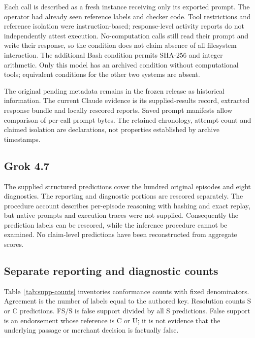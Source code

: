 Each call is described as a fresh instance receiving only its exported prompt. The operator had already seen reference labels and checker code. Tool restrictions and reference isolation were instruction-based; response-level activity reports do not independently attest execution. No-computation calls still read their prompt and write their response, so the condition does not claim absence of all filesystem interaction. The additional Bash condition permits SHA-256 and integer arithmetic. Only this model has an archived condition without computational tools; equivalent conditions for the other two systems are absent.

The original pending metadata remains in the frozen release as historical information. The current Claude evidence is its supplied-results record, extracted response bundle and locally rescored reports. Saved prompt manifests allow comparison of per-call prompt bytes. The retained chronology, attempt count and claimed isolation are declarations, not properties established by archive timestamps.

\subsection{Grok 4.7}
The supplied structured predictions cover the hundred original episodes and eight diagnostics. The reporting and diagnostic portions are rescored separately. The procedure account describes per-episode reasoning with hashing and exact replay, but native prompts and execution traces were not supplied. Consequently the prediction labels can be rescored, while the inference procedure cannot be examined. No claim-level predictions have been reconstructed from aggregate scores.

\subsection{Separate reporting and diagnostic counts}
Table~\ref{tab:supp-counts} inventories conformance counts with fixed denominators. Agreement is the number of labels equal to the authored key. Resolution counts S or C predictions. FS/S is false support divided by all S predictions. False support is an endorsement whose reference is C or U; it is not evidence that the underlying passage or merchant decision is factually false.

